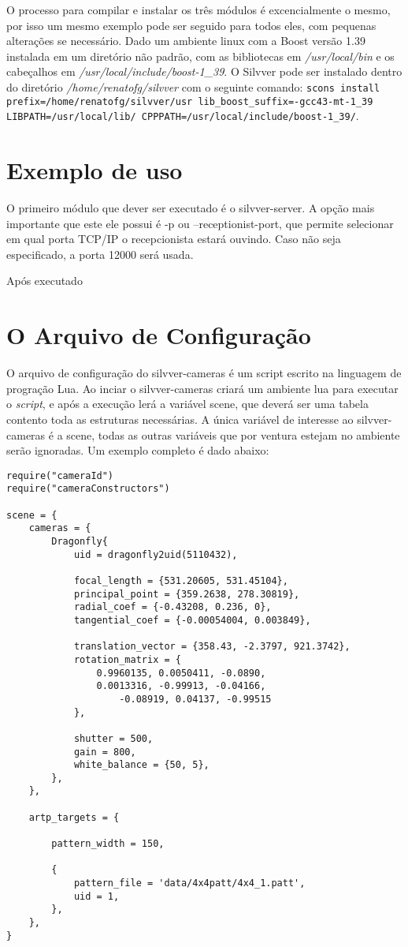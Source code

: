 \documentclass[a4paper,10pt]{article}
\begin{document}
O processo para compilar e instalar os três módulos é excencialmente o mesmo,
por isso um mesmo exemplo pode ser seguido para todos eles, com pequenas
alterações se necessário. Dado um ambiente linux com a Boost versão 1.39
instalada em um diretório não padrão, com as bibliotecas em
\emph{/usr/local/bin} e os cabeçalhos em
\emph{/usr/local/include/boost-1\_39}. O Silvver pode ser instalado dentro do
diretório \emph{/home/renatofg/silvver} com o seguinte comando: \texttt{scons
  install prefix=/home/renatofg/silvver/usr lib\_boost\_suffix=-gcc43-mt-1\_39
  LIBPATH=/usr/local/lib/ CPPPATH=/usr/local/include/boost-1\_39/}.

\section{Exemplo de uso}

O primeiro módulo que dever ser executado é o silvver-server. A opção mais
importante que este ele possui é -p ou --receptionist-port, que permite
selecionar em qual porta TCP/IP o recepcionista estará ouvindo. Caso não seja
especificado, a porta 12000 será usada.

Após executado 

\section{O Arquivo de Configuração}

O arquivo de configuração do silvver-cameras é um script escrito na
linguagem de progração Lua\cite{lua}. Ao inciar o silvver-cameras criará um
ambiente lua para executar o \emph{script}, e após a execução lerá a variável
scene, que deverá ser uma tabela contento toda as estruturas necessárias.
A única variável de interesse ao silvver-cameras é a scene, todas as outras
variáveis que por ventura estejam no ambiente serão ignoradas.  Um exemplo
completo é dado abaixo:

\begin{lstlisting}[frame=lines]
require("cameraId")
require("cameraConstructors")

scene = {
    cameras = {
        Dragonfly{
            uid = dragonfly2uid(5110432),

            focal_length = {531.20605, 531.45104},
            principal_point = {359.2638, 278.30819},
            radial_coef = {-0.43208, 0.236, 0},
            tangential_coef = {-0.00054004, 0.003849},

            translation_vector = {358.43, -2.3797, 921.3742},
            rotation_matrix = {
                0.9960135, 0.0050411, -0.0890,
                0.0013316, -0.99913, -0.04166,
                    -0.08919, 0.04137, -0.99515
            },

            shutter = 500,
            gain = 800,
            white_balance = {50, 5},
        },
    },

    artp_targets = {

        pattern_width = 150,

        {
            pattern_file = 'data/4x4patt/4x4_1.patt',
            uid = 1,
        },
    },
}
\end{lstlisting}
\end{document}
